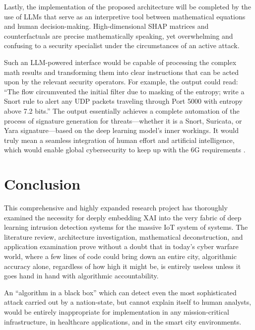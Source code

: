 \documentclass[12pt]{article}
\begin{document}
Lastly, the implementation of the proposed architecture will be completed by the use of LLMs that serve as an interpretive tool between mathematical equations and human decision-making. High-dimensional SHAP matrices and counterfactuals are precise mathematically speaking, yet overwhelming and confusing to a security specialist under the circumstances of an active attack.

Such an LLM-powered interface would be capable of processing the complex math results and transforming them into clear instructions that can be acted upon by the relevant security operators. For example, the output could read: “The flow circumvented the initial filter due to masking of the entropy; write a Snort rule to alert any UDP packets traveling through Port 5000 with entropy above 7.2 bits.” The output essentially achieves a complete automation of the process of signature generation for threats—whether it is a Snort, Suricata, or Yara signature—based on the deep learning model’s inner workings. It would truly mean a seamless integration of human effort and artificial intelligence, which would enable global cybersecurity to keep up with the 6G requirements \cite{mdpi2025industry5}.

    \section{Conclusion}
    
    This comprehensive and highly expanded research project has thoroughly examined the necessity for deeply embedding XAI into the very fabric of deep learning intrusion detection systems for the massive IoT system of systems. The literature review, architecture investigation, mathematical deconstruction, and application examination prove without a doubt that in today’s cyber warfare world, where a few lines of code could bring down an entire city, algorithmic accuracy alone, regardless of how high it might be, is entirely useless unless it goes hand in hand with algorithmic accountability.
    
    	An “algorithm in a black box” which can detect even the most sophisticated attack carried out by a nation-state, but cannot explain itself to human analysts, would be entirely inappropriate for implementation in any mission-critical infrastructure, in healthcare applications, and in the smart city environments.
\end{document}
